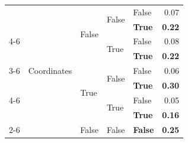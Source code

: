 \begin{tabular}{@{}lllllr@{}}
                                                & \multirow[c]{9}{*}{Coordinates}   & \multirow[c]{4}{*}{False} & \multirow[c]{2}{*}{False} & False                 & 0.07 \\
                                                &                                   &                           &                           & \textbf{True}         & \textbf{0.22} \\
    \cmidrule{4-6}                                                                                                                                                     
                                                &                                   &                           & \multirow[c]{2}{*}{True}  & False                 & 0.08 \\
                                                &                                   &                           &                           & \textbf{True}         & \textbf{0.22} \\
    \cmidrule{3-6}                                                                                                                                                     
                                                &                                   & \multirow[c]{4}{*}{True}  & \multirow[c]{2}{*}{False} & False                 & 0.06 \\
                                                &                                   &                           &                           & \textbf{True}         & \textbf{0.30} \\
    \cmidrule{4-6}                                                                                                                                                     
                                                &                                   &                           & \multirow[c]{2}{*}{True}  & False                 & 0.05 \\
                                                &                                   &                           &                           & \textbf{True}         & \textbf{0.16} \\
    \cmidrule{2-6}                                                                                                                                                     
                                                & \multirow[c]{9}{*}{RGB}           & \multirow[c]{4}{*}{False} & \multirow[c]{2}{*}{False} & \textbf{False}        & \textbf{0.25} \\

\end{tabular}
